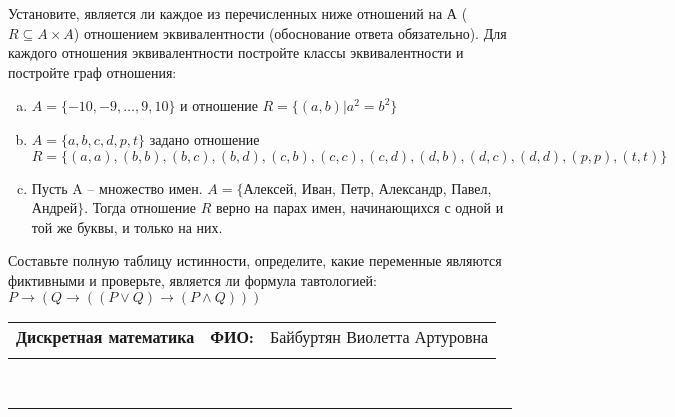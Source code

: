 \documentclass[10pt]{exam}
\newcommand{\class}{Дискретная математика}
\newcommand{\examdate}{}
\begin{document}
\begin{questions}
\question
Установите, является ли каждое из перечисленных ниже отношений на А ($R \subseteq A \times A$) отношением эквивалентности (обоснование ответа обязательно). Для каждого отношения эквивалентности постройте классы 
эквивалентности и постройте граф отношения:
\begin{enumerate} [a)]\setcounter{enumi}{0}
\item $A = \{-10, -9, … , 9, 10\}$ и отношение $R = \{(a,b)|a^{2} = b^{2}\}$
\item $A = \{a, b, c, d, p, t\}$ задано отношение $R = \{(a, a), (b, b), (b, c), (b, d), (c, b), (c, c), (c, d), (d, b), (d, c), (d, d), (p,p), (t,t)\}$
\item Пусть A – множество имен. $A = \{ $Алексей, Иван, Петр, Александр, Павел, Андрей$ \}$. Тогда отношение $R$ верно на парах имен, начинающихся с одной и той же буквы, и только на них.
\end{enumerate}\question Составьте полную таблицу истинности, определите, какие переменные являются фиктивными и проверьте, является ли формула тавтологией:
$ P \rightarrow (Q \rightarrow ((P \lor Q) \rightarrow (P \land Q)))$

\end{questions}
\newpage
\begin{flushright}
\begin{tabular}{p{2.8in} r l}
\textbf{\class} & \textbf{ФИО:} &Байбуртян Виолетта Артуровна
\\

\textbf{\examdate} &&\\
\end{tabular}\\
\end{flushright}
\rule[1ex]{\textwidth}{.1pt}
\end{document}
